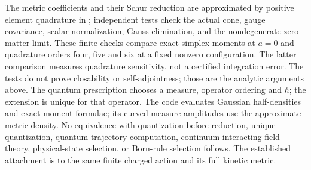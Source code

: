 The metric coefficients and their Schur reduction are approximated by
positive element quadrature in
; independent
tests check the actual cone, gauge covariance, scalar normalization,
Gauss elimination, and the nondegenerate zero-matter limit. These finite
checks compare exact simplex moments at \(a=0\) and quadrature orders
four, five and six at a fixed nonzero configuration. The latter comparison
measures quadrature sensitivity, not a certified integration error. The
tests do not prove closability or self-adjointness; those are the analytic
arguments above. The quantum prescription chooses a measure, operator
ordering and \(\hbar\); the extension is unique for that operator.
The code evaluates Gaussian half-densities and exact moment formulae;
its curved-measure amplitudes use the approximate metric density.
No equivalence with quantization before reduction, unique quantization,
quantum trajectory computation, continuum interacting field theory,
physical-state selection, or Born-rule selection follows.
The established attachment is to the same finite
charged action and its full kinetic metric.
